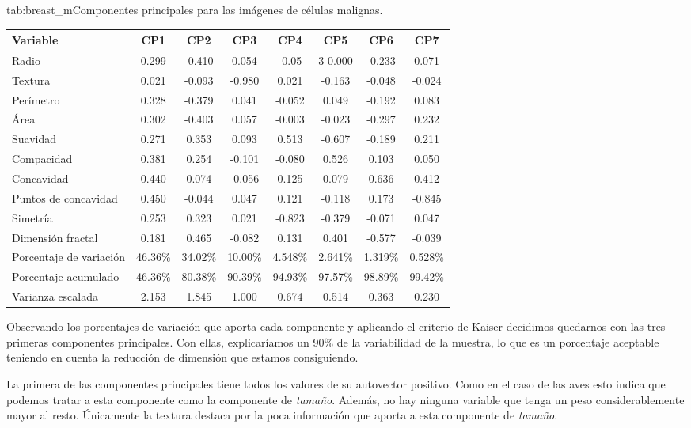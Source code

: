 \documentclass[tfg,cienciasbased,lot,lof,covers,final,overleaf,nocopyright]{tfgtfmthesisuam}
\begin{document}
\begin{table}{tab:breast_m}{Componentes principales para las imágenes de células malignas.}
    \begin{tabular}{lccccccc}
        \toprule \textbf{Variable} & \textbf{CP1} & \textbf{CP2} & \textbf{CP3} & \textbf{CP4} & \textbf{CP5} & \textbf{CP6} & \textbf{CP7}\\
        \midrule
        Radio & 0.299 & -0.410 &  0.054 & -0.05 &3  0.000 & -0.233 &  0.071\\
        Textura & 0.021 & -0.093 & -0.980 &  0.021 & -0.163 & -0.048 & -0.024\\
        Perímetro & 0.328 & -0.379 &  0.041 & -0.052 &  0.049 & -0.192 &  0.083\\
        Área & 0.302 & -0.403 &  0.057 & -0.003 & -0.023 & -0.297 &  0.232\\
        Suavidad & 0.271 &  0.353 &  0.093 &  0.513 & -0.607 & -0.189 &  0.211\\
        Compacidad & 0.381 &  0.254 & -0.101 & -0.080 &  0.526 &  0.103 &  0.050\\
        Concavidad & 0.440 &  0.074 & -0.056 &  0.125 &  0.079 &  0.636 &  0.412\\
        Puntos de concavidad & 0.450 & -0.044 &  0.047 &  0.121 & -0.118 &  0.173 & -0.845\\
        Simetría & 0.253 & 0.323 &  0.021 & -0.823 & -0.379 & -0.071 &  0.047\\
        Dimensión fractal & 0.181 &  0.465 & -0.082 &  0.131 &  0.401 & -0.577 & -0.039\\
        \midrule Porcentaje de variación & 46.36\% & 34.02\% & 10.00\% & 4.548\% & 2.641\% & 1.319\% & 0.528\%\\
        Porcentaje acumulado & 46.36\% & 80.38\% & 90.39\% & 94.93\% & 97.57\% & 98.89\% & 99.42\%\\
        Varianza escalada & 2.153 & 1.845 & 1.000 & 0.674 & 0.514 & 0.363 & 0.230\\
        \bottomrule
    \end{tabular}
\end{table}

Observando los porcentajes de variación que aporta cada componente y aplicando el criterio de Kaiser decidimos quedarnos con las tres primeras componentes principales. Con ellas, explicaríamos un 90\% de la variabilidad de la muestra, lo que es un porcentaje aceptable teniendo en cuenta la reducción de dimensión que estamos consiguiendo.

La primera de las componentes principales tiene todos los valores de su autovector positivo. Como en el caso de las aves esto indica que podemos tratar a esta componente como la componente de \textit{tamaño}. Además, no hay ninguna variable que tenga un peso considerablemente mayor al resto. Únicamente la textura destaca por la poca información que aporta a esta componente de \textit{tamaño}.
\end{document}

